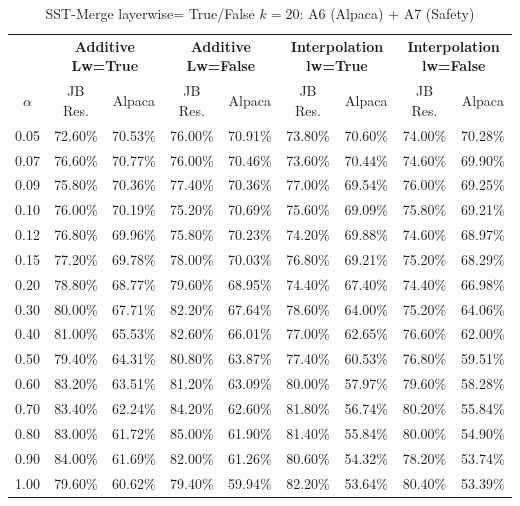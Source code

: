 \begin{table}[h]
\centering
\caption{SST-Merge layerwise= True/False $k=20$: A6 (Alpaca) + A7 (Safety)}
\label{tab:res_a6_a7_sst_20}
\begin{tabular}{c|cc|cc|cc|cc}
\hline
 & \multicolumn{2}{c|}{\textbf{Additive Lw=True}} & \multicolumn{2}{c|}{\textbf{Additive Lw=False}} & \multicolumn{2}{c|}{\textbf{Interpolation lw=True}}& \multicolumn{2}{c}{\textbf{Interpolation lw=False}} \\
$\alpha$ & JB Res. & Alpaca & JB Res. & Alpaca & JB Res. & Alpaca & JB Res. & Alpaca \\
\hline
0.05 & 72.60\% & 70.53\% & 76.00\% & 70.91\% & 73.80\% & 70.60\% & 74.00\% & 70.28\% \\
0.07 & 76.60\% & 70.77\% & 76.00\% & 70.46\% & 73.60\% & 70.44\% & 74.60\% & 69.90\% \\
0.09 & 75.80\% & 70.36\% & 77.40\% & 70.36\% & 77.00\% & 69.54\% & 76.00\% & 69.25\% \\
0.10 & 76.00\% & 70.19\% & 75.20\% & 70.69\% & 75.60\% & 69.09\% & 75.80\% & 69.21\% \\
0.12 & 76.80\% & 69.96\% & 75.80\% & 70.23\% & 74.20\% & 69.88\% & 74.60\% & 68.97\% \\
0.15 & 77.20\% & 69.78\% & 78.00\% & 70.03\% & 76.80\% & 69.21\% & 75.20\% & 68.29\% \\
0.20 & 78.80\% & 68.77\% & 79.60\% & 68.95\% & 74.40\% & 67.40\% & 74.40\% & 66.98\% \\
0.30 & 80.00\% & 67.71\% & 82.20\% & 67.64\% & 78.60\% & 64.00\% & 75.20\% & 64.06\% \\
0.40 & 81.00\% & 65.53\% & 82.60\% & 66.01\% & 77.00\% & 62.65\% & 76.60\% & 62.00\% \\
0.50 & 79.40\% & 64.31\% & 80.80\% & 63.87\% & 77.40\% & 60.53\% & 76.80\% & 59.51\% \\
0.60 & 83.20\% & 63.51\% & 81.20\% & 63.09\% & 80.00\% & 57.97\% & 79.60\% & 58.28\% \\
0.70 & 83.40\% & 62.24\% & 84.20\% & 62.60\% & 81.80\% & 56.74\% & 80.20\% & 55.84\% \\
0.80 & 83.00\% & 61.72\% & 85.00\% & 61.90\% & 81.40\% & 55.84\% & 80.00\% & 54.90\% \\
0.90 & 84.00\% & 61.69\% & 82.00\% & 61.26\% & 80.60\% & 54.32\% & 78.20\% & 53.74\% \\
1.00 & 79.60\% & 60.62\% & 79.40\% & 59.94\% & 82.20\% & 53.64\% & 80.40\% & 53.39\% \\
\hline
\end{tabular}
\end{table}
\FloatBarrier

